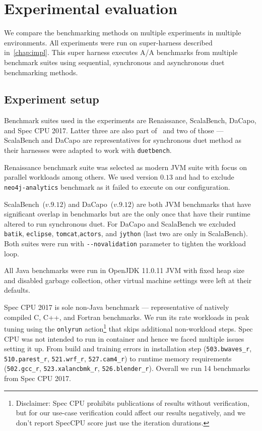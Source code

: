 \chapter{Experimental evaluation}
\label{chap:evaluation}

We compare the benchmarking methods on multiple experiments in multiple environments.
All experiments were run on super-harness described in~\cref{chap:impl}.
This super harness executes A/A benchmarks from multiple benchmark suites using sequential, synchronous and asynchronous duet benchmarking methods.

\section{Experiment setup}
\label{sec:experiment_setup}

Benchmark suites used in the experiments are Renaissance, ScalaBench, DaCapo, and  Spec CPU 2017.
Latter three are also part of~\citet{bulej2020duet} and two of those --- ScalaBench and DaCapo are representatives for synchronous duet method as their harnesses were adapted to work with \lstinline{duetbench}.

Renaissance benchmark suite was selected as modern JVM suite with focus on parallel workloads among others\cite{prokopec2019renaissance}.
We used version $0.13$ and had to exclude \lstinline{neo4j-analytics} benchmark as it failed to execute on our configuration.

ScalaBench~($v.9.12$) and DaCapo~($v.9.12$) are both JVM benchmarks that have significant overlap in benchmarks but are the only once that have their runtime altered to run synchronous duet.
For DaCapo and ScalaBench we excluded \lstinline{batik}, \lstinline{eclipse}, \lstinline{tomcat},\lstinline{actors}, and \lstinline{jython} (last two are only in ScalaBench).
Both suites were run with \lstinline{--novalidation} parameter to tighten the workload loop.

All Java benchmarks were run in OpenJDK 11.0.11 JVM with fixed heap size and disabled garbage collection, other virtual machine settings were left at their defaults.

Spec CPU 2017 is sole non-Java benchmark --- representative of natively compiled C, C++, and Fortran benchmarks.
We run its rate workloads in peak tuning using the \lstinline{onlyrun} action\footnote{Disclaimer: Spec CPU prohibits publications of results without verification, but for our use-case verification could affect our results negatively, and we don't report SpecCPU score just use the iteration durations.} that skips additional non-workload steps.
Spec CPU was not intended to run in container and hence we faced multiple issues setting it up.
From build and training errors in installation step (\lstinline{503.bwaves_r}, \lstinline{510.parest_r}, \lstinline{521.wrf_r}, \lstinline{527.cam4_r}) to runtime memory requirements (\lstinline{502.gcc_r}, \lstinline{523.xalancbmk_r}, \lstinline{526.blender_r}).
Overall we run 14 benchmarks from Spec CPU 2017.


